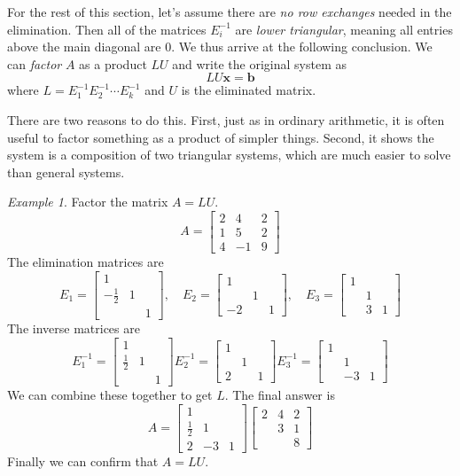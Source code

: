 \documentclass[11pt,oneside]{amsbook}
\theoremstyle{definition}
\theoremstyle{plain}
\theoremstyle{definition}
\theoremstyle{remark}
\newtheorem{example}[theorem]{Example}
\numberwithin{equation}{section}
\numberwithin{figure}{section}
\begin{document}
For the rest of this section, let's assume there are \emph{no row exchanges} needed in the elimination. Then all of the matrices $E_i^{-1}$ are \emph{lower triangular}, meaning all entries above the main diagonal are $0$. We thus arrive at the following conclusion. We can \emph{factor} $A$ as a product $LU$ and write the original system as
\[LU\mathbf{x}=\mathbf{b}
\]
where $L=E_1^{-1}E_2^{-1}\cdots E_k^{-1}$ and $U$ is the eliminated matrix.

There are two reasons to do this. First, just as in ordinary arithmetic, it is often useful to factor something as a product of simpler things. Second, it shows the system is a composition of two triangular systems, which are much easier to solve than general systems.

\begin{example}
  Factor the matrix $A=LU$.
  \[A=\begin{bmatrix}2&4&2\\1&5&2\\4&-1&9\end{bmatrix}
  \]
  The elimination matrices are
  \[E_1=\begin{bmatrix}1\\-\frac12&1\\&&1\end{bmatrix},\quad
    E_2=\begin{bmatrix}1\\&1\\-2&&1\end{bmatrix},\quad
    E_3=\begin{bmatrix}1\\&1\\&3&1\end{bmatrix}
  \]
  The inverse matrices are
  \[E_1^{-1}=\begin{bmatrix}1\\\frac12&1\\&&1\end{bmatrix}
    E_2^{-1}=\begin{bmatrix}1\\&1\\2&&1\end{bmatrix}
    E_3^{-1}=\begin{bmatrix}1\\&1\\&-3&1\end{bmatrix}
  \]
  We can combine these together to get $L$. The final answer is
  \[A=\begin{bmatrix}1&&\\\frac12&1&\\2&-3&1\end{bmatrix}
    \begin{bmatrix}2&4&2\\&3&1\\&&8\end{bmatrix}
  \]
  Finally we can confirm that $A=LU$.
\end{example}
\end{document}
